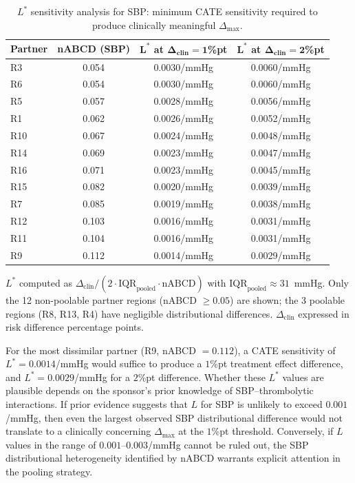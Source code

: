 \begin{table}[ht]
\caption{$L^*$ sensitivity analysis for SBP: minimum CATE sensitivity required to produce clinically meaningful $\Delta_{\max}$.\label{tab:gusto_lstar}}
\begin{tabular*}{\textwidth}{@{\extracolsep\fill}lccc@{}}
\toprule
\textbf{Partner} & \textbf{nABCD (SBP)} & $\boldsymbol{L^*}$ \textbf{at} $\boldsymbol{\Delta_{\text{clin}} = 1}$\textbf{\%pt} & $\boldsymbol{L^*}$ \textbf{at} $\boldsymbol{\Delta_{\text{clin}} = 2}$\textbf{\%pt} \\
\midrule
R3  & 0.054 & 0.0030/mmHg & 0.0060/mmHg \\
R6  & 0.054 & 0.0030/mmHg & 0.0060/mmHg \\
R5  & 0.057 & 0.0028/mmHg & 0.0056/mmHg \\
R1  & 0.062 & 0.0026/mmHg & 0.0052/mmHg \\
R10 & 0.067 & 0.0024/mmHg & 0.0048/mmHg \\
R14 & 0.069 & 0.0023/mmHg & 0.0047/mmHg \\
R16 & 0.071 & 0.0023/mmHg & 0.0045/mmHg \\
R15 & 0.082 & 0.0020/mmHg & 0.0039/mmHg \\
R7  & 0.085 & 0.0019/mmHg & 0.0038/mmHg \\
R12 & 0.103 & 0.0016/mmHg & 0.0031/mmHg \\
R11 & 0.104 & 0.0016/mmHg & 0.0031/mmHg \\
R9  & 0.112 & 0.0014/mmHg & 0.0029/mmHg \\
\bottomrule
\end{tabular*}
\begin{tablenotes}
\item $L^*$ computed as $\Delta_{\text{clin}} / (2 \cdot \text{IQR}_{\text{pooled}} \cdot \text{nABCD})$ with $\text{IQR}_{\text{pooled}} \approx 31$~mmHg. Only the 12 non-poolable partner regions (nABCD $\geq 0.05$) are shown; the 3 poolable regions (R8, R13, R4) have negligible distributional differences. $\Delta_{\text{clin}}$ expressed in risk difference percentage points.
\end{tablenotes}
\end{table}

For the most dissimilar partner (R9, nABCD $= 0.112$), a CATE sensitivity of $L^* = 0.0014$/mmHg would suffice to produce a $1$\%pt treatment effect difference, and $L^* = 0.0029$/mmHg for a $2$\%pt difference. Whether these $L^*$ values are plausible depends on the sponsor's prior knowledge of SBP--thrombolytic interactions. If prior evidence suggests that $L$ for SBP is unlikely to exceed $0.001$/mmHg, then even the largest observed SBP distributional difference would not translate to a clinically concerning $\Delta_{\max}$ at the $1$\%pt threshold. Conversely, if $L$ values in the range of $0.001$--$0.003$/mmHg cannot be ruled out, the SBP distributional heterogeneity identified by nABCD warrants explicit attention in the pooling strategy.

